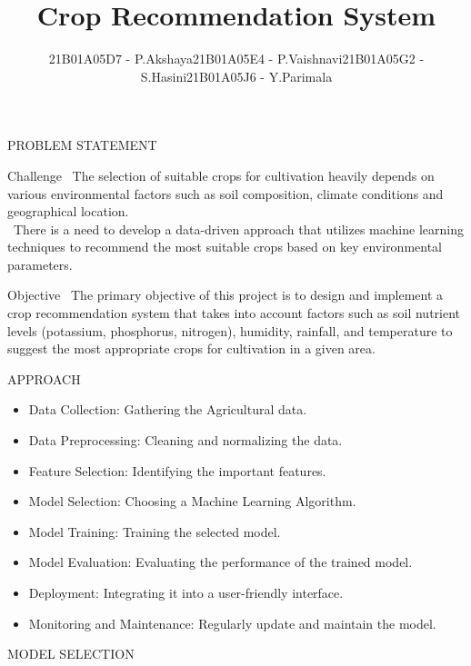 \documentclass{beamer}
\title{Crop Recommendation System}
\author{
\begin{itemize}
    \item 21B01A05D7 - P.Akshaya
    \item 21B01A05E4 - P.Vaishnavi
    \item 21B01A05G2 - S.Hasini
    \item 21B01A05J6 - Y.Parimala
\end{itemize}
}
\begin{document}
\begin{frame}
\titlepage
\end{frame}

\begin{frame}{PROBLEM STATEMENT}
\begin{block}{Challenge}
     {\ The selection of suitable crops for cultivation heavily depends on various environmental factors such as soil composition, climate conditions and geographical location.}\\
     {\ There is a need to develop a data-driven approach that utilizes machine learning techniques to recommend the most suitable crops based on key environmental parameters.}
\end{block}
\begin{block}{Objective}
    {\ The primary objective of this project is to design and implement a crop recommendation system that takes into account factors such as soil nutrient levels (potassium, phosphorus, nitrogen), humidity, rainfall, and temperature to suggest the most appropriate crops for cultivation in a given area.}
\end{block}
\end{frame}

\begin{frame}{APPROACH}
\begin{itemize}
  \item Data Collection: Gathering the Agricultural data.
    \item Data Preprocessing: Cleaning and normalizing the data.
    \item Feature Selection: Identifying the important features.
    \item Model Selection: Choosing a Machine Learning Algorithm.
    \item Model Training: Training the selected model.
    \item Model Evaluation: Evaluating the performance of the trained model.
    \item Deployment:  Integrating it into a user-friendly interface.
    \item Monitoring and Maintenance: Regularly update and maintain the model.
\end{itemize}
\end{frame}

\begin{frame}{MODEL SELECTION }

{}
\end{frame}
\end{document}
